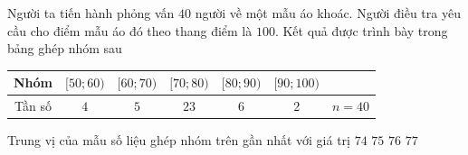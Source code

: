 \begin{ex}%
	Người ta tiến hành phỏng vấn $40$ người về một mẫu áo khoác. Người điều  tra yêu cầu cho điểm mẫu áo đó theo thang điểm là $100$. Kết quả được trình bày trong bảng ghép nhóm sau
	\begin{center}
		\begin{tabular}{|c|c|c|c|c|c|c|}
			\hline 
			Nhóm & $[50; 60)$ &  $[60; 70)$ & $[70; 80)$ & $[80; 90)$ & $[90; 100)$ & \\
			\hline 
			Tần số & $4$ & $5$ & $23$ & $6$ & $2$  & $n=40$ \\
			\hline 
		\end{tabular}
	\end{center}
	Trung vị của mẫu số liệu ghép nhóm trên gần nhất với giá  trị
	\choice 
		 {$74$}
		{\True $75$} 
		{$76$} 
		 {$77$}
\end{ex}

